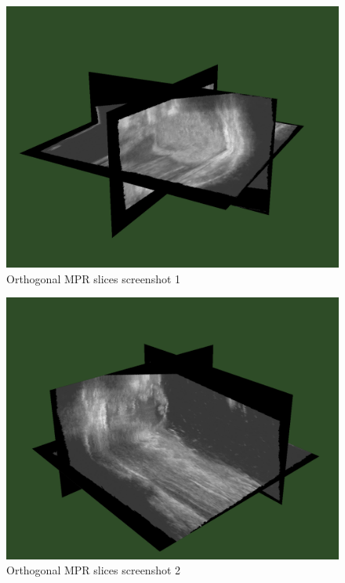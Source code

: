 \begin{figure}[h]
\centering
\includegraphics[height=0.45\textheight]{graphics/orthogonal_screen0.png}
\caption{Orthogonal MPR slices screenshot 1}
\label{fig:large_orthogonal_screen0}
\end{figure}

\begin{figure}[h]
\centering
\includegraphics[height=0.45\textheight]{graphics/orthogonal_screen1.png}
\caption{Orthogonal MPR slices screenshot 2}
\label{fig:large_orthogonal_screen1}
\end{figure}

